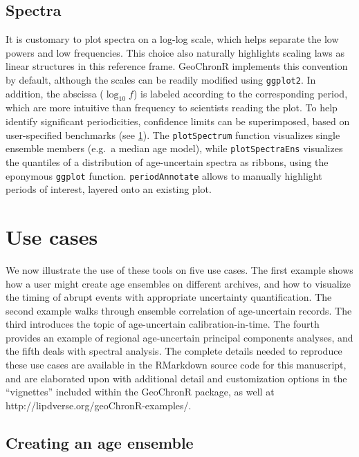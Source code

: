 \documentclass[gchron, manuscript]{copernicus}
\begin{document}
\hypertarget{sec:spec_viz}{%
\subsection{Spectra}\label{sec:spec_viz}}

It is customary to plot spectra on a log-log scale, which helps separate the low powers and low frequencies.
This choice also naturally highlights scaling laws \citep{lovejoy2013weather, ZhuPNAS2019} as linear structures in this reference frame.
GeoChronR implements this convention by default, although the scales can be readily modified using \texttt{ggplot2}.
In addition, the abscissa (\(\log_{10} f\)) is labeled according to the corresponding period, which are more intuitive than frequency to scientists reading the plot.
To help identify significant periodicities, confidence limits can be superimposed, based on user-specified benchmarks (see \ref{sec:use-cases}).
The \texttt{plotSpectrum} function visualizes single ensemble members (e.g.~a median age model), while \texttt{plotSpectraEns} visualizes the quantiles of a distribution of age-uncertain spectra as ribbons, using the eponymous \texttt{ggplot} function.
\texttt{periodAnnotate} allows to manually highlight periods of interest, layered onto an existing plot.

\hypertarget{sec:use-cases}{%
\section{Use cases}\label{sec:use-cases}}

We now illustrate the use of these tools on five use cases.
The first example shows how a user might create age ensembles on different archives, and how to visualize the timing of abrupt events with appropriate uncertainty quantification.
The second example walks through ensemble correlation of age-uncertain records.
The third introduces the topic of age-uncertain calibration-in-time.
The fourth provides an example of regional age-uncertain principal components analyses, and the fifth deals with spectral analysis.
The complete details needed to reproduce these use cases are available in the RMarkdown source code for this manuscript, and are elaborated upon with additional detail and customization options in the ``vignettes'' included within the GeoChronR package, as well at http://lipdverse.org/geoChronR-examples/.

\hypertarget{sec:create_age}{%
\subsection{Creating an age ensemble}\label{sec:create_age}}
\end{document}
